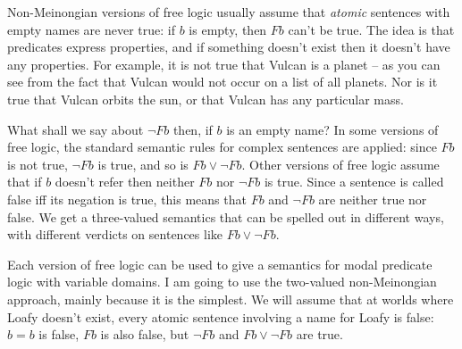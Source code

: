 Non-Meinongian versions of free logic usually assume that \emph{atomic}
sentences with empty names are never true: if $b$ is empty, then $Fb$ can't be
true. The idea is that predicates express properties, and if something doesn't
exist then it doesn't have any properties. For example, it is not true that
Vulcan is a planet -- as you can see from the fact that Vulcan would not occur
on a list of all planets. Nor is it true that Vulcan orbits the sun, or that
Vulcan has any particular mass.


What shall we say about $\neg Fb$ then, if $b$ is an empty name? In some
versions of free logic, the standard semantic rules for complex sentences are
applied: since $Fb$ is not true, $\neg Fb$ is true, and so is $Fb \lor \neg Fb$.
Other versions of free logic assume that if $b$ doesn't refer then neither $Fb$
nor $\neg Fb$ is true. Since a sentence is called false iff its negation is
true, this means that $Fb$ and $\neg Fb$ are neither true nor false. We get a
three-valued semantics that can be spelled out in different ways, with different
verdicts on sentences like $Fb \lor \neg Fb$.

Each version of free logic can be used to give a semantics for modal predicate
logic with variable domains. I am going to use the two-valued non-Meinongian
approach, mainly because it is the simplest. We will assume that at worlds where
Loafy doesn't exist, every atomic sentence involving a name for Loafy is false:
$b=b$ is false, $Fb$ is also false, but $\neg Fb$ and $Fb \lor \neg Fb$ are
true.


